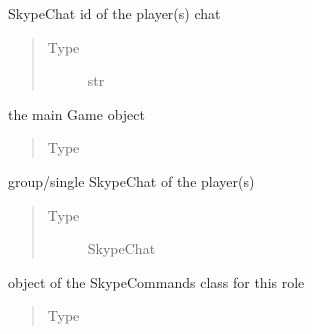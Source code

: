 \documentclass[letterpaper,10pt,english]{sphinxmanual}
\begin{document}
\begin{fulllineitems}
\begin{fulllineitems}
\begin{quote}
\begin{description}
\end{description}\end{quote}

\end{fulllineitems}



\begin{fulllineitems}
SkypeChat id of the player(s) chat
\begin{quote}\begin{description}
\item[{Type}] \leavevmode
str

\end{description}\end{quote}

\end{fulllineitems}



\begin{fulllineitems}
the main Game object
\begin{quote}\begin{description}
\item[{Type}] \leavevmode
{\hyperref[\detokenize{chatwolf:chatwolf.game.Game}]{}}

\end{description}\end{quote}

\end{fulllineitems}



\begin{fulllineitems}
group/single SkypeChat of the player(s)
\begin{quote}\begin{description}
\item[{Type}] \leavevmode
SkypeChat

\end{description}\end{quote}

\end{fulllineitems}



\begin{fulllineitems}
object of the SkypeCommands class for this role
\begin{quote}\begin{description}
\item[{Type}] \leavevmode
{\hyperref[\detokenize{chatwolf:chatwolf.skypecommands.SkypeCommands}]{}}


\end{description}
\end{quote}
\end{fulllineitems}
\end{fulllineitems}
\end{document}
